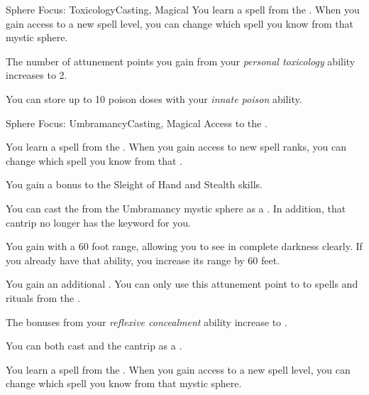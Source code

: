 \begin{feat}{Sphere Focus: Toxicology}{Casting, Magical}
         You learn a spell from the  .
        When you gain access to a new spell level, you can change which spell you know from that mystic sphere.

         The number of attunement points you gain from your \textit{personal toxicology} ability increases to 2.

         You can store up to 10 poison doses with your \textit{innate poison} ability.
    \end{feat}

    \begin{feat}{Sphere Focus: Umbramancy}{Casting, Magical}
        \featpre Access to the  .

         You learn a spell from the  .
        When you gain access to new spell ranks, you can change which spell you know from that .

         You gain a  bonus to the Sleight of Hand and Stealth skills.

         You can cast the   from the Umbramancy mystic sphere as a .
        In addition, that cantrip no longer has the  keyword for you.

         You gain  with a 60 foot range, allowing you to see in complete darkness clearly.
        If you already have that ability, you increase its range by 60 feet.

         You gain an additional .
        You can only use this attunement point to  to spells and rituals from the  .

         The bonuses from your \textit{reflexive concealment} ability increase to .

         You can both cast and  the  cantrip as a .

         You learn a spell from the  .
        When you gain access to a new spell level, you can change which spell you know from that mystic sphere.


\end{feat}
